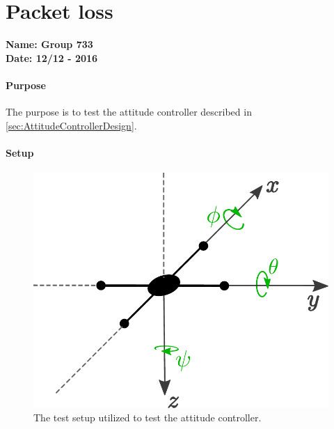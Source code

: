 \chapter{Packet loss}\label{app:Packetloss} 
\textbf{Name: Group 733}\\
\textbf{Date: 12/12 - 2016}

\subsubsection{Purpose}
The purpose is to test the attitude controller described in \autoref{sec:AttitudeControllerDesign}.


\subsubsection{Setup}
\begin{figure}[H]
	\centering
	\includegraphics[scale=0.4]{figures/plusConfiguration}
	\caption{The test setup utilized to test the attitude controller.}
	\label{fig:AttitudeControllerTestsetup}
\end{figure}

